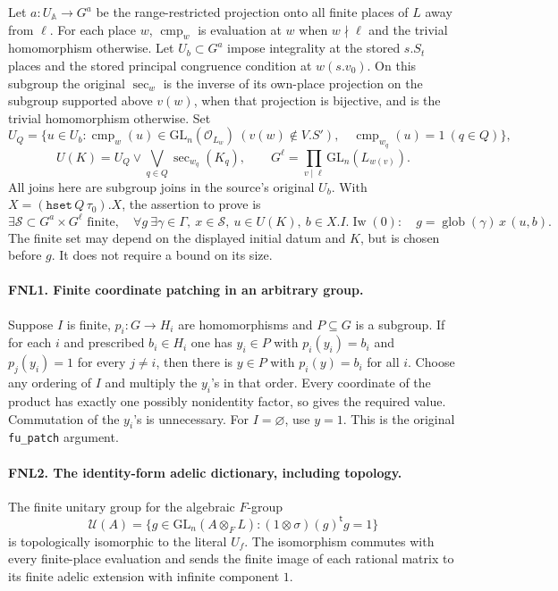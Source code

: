 Let \(a:U_{\mathbb A}\to G^a\) be the range-restricted projection onto
all finite places of \(L\) away from \(\ell\).  For each place \(w\),
\(\operatorname{cmp}_w\) is evaluation at \(w\) when \(w\nmid\ell\)
and the trivial homomorphism otherwise.  Let \(U_b\subset G^a\) impose
integrality at the stored \(s.S_t\) places and the stored principal
congruence condition at \(w(s.v_0)\).  On this subgroup the original
\(\operatorname{sec}_w\) is the inverse of its own-place projection
on the subgroup supported above \(v(w)\), when that projection is
bijective, and is the trivial homomorphism otherwise.  Set
\[
 U_Q=\{u\in U_b:\operatorname{cmp}_w(u)\in\mathrm{GL}_n(\mathcal O_{L_w})
      \ (v(w)\notin V.S'),\quad
      \operatorname{cmp}_{w_q}(u)=1\ (q\in Q)\},
\]
\[
 U(K)=U_Q\vee\bigvee_{q\in Q}\operatorname{sec}_{w_q}(K_q),\qquad
 G^\ell=\prod_{v\mid\ell}\mathrm{GL}_n(L_{w(v)}).
\]
All joins here are subgroup joins in the source's original \(U_b\).
With \(X=(\texttt{hset}\,Q\,\tau_0).X\), the assertion to prove is
\begin{equation}\label{eq:fnl-target}
 \exists\mathcal S\subset G^a\times G^\ell\text{ finite},\quad
 \forall g\ \exists\gamma\in\Gamma,\ x\in\mathcal S,\ u\in U(K),\
 b\in X.I.\operatorname{Iw}(0):\quad
             g=\operatorname{glob}(\gamma)\,x\,(u,b).
\end{equation}
The finite set may depend on the displayed initial datum and \(K\), but
is chosen before \(g\).  It does not require a bound on its size.

\paragraph{FNL1. Finite coordinate patching in an arbitrary group.}
\label{claim:FNL1}
Suppose \(I\) is finite, \(p_i:G\to H_i\) are homomorphisms and
\(P\subseteq G\) is a subgroup.  If for each \(i\) and prescribed
\(b_i\in H_i\) one has \(y_i\in P\) with
\(p_i(y_i)=b_i\) and \(p_j(y_i)=1\) for every \(j\ne i\), then there
is \(y\in P\) with \(p_i(y)=b_i\) for all \(i\).
Choose any ordering of \(I\) and multiply the \(y_i\)'s in that order.
Every coordinate of the product has exactly one possibly nonidentity
factor, so gives the required value.  Commutation of the \(y_i\)'s is
unnecessary.  For \(I=\varnothing\), use \(y=1\).
This is the original \texttt{fu\_patch} argument.

\paragraph{FNL2. The identity-form adelic dictionary, including topology.}
\label{claim:FNL2}
The finite unitary group for the algebraic \(F\)-group
\[
 \mathcal U(A)=\{g\in\mathrm{GL}_n(A\otimes_F L):
                     (1\otimes\sigma)(g)^{\mathsf t}g=1\}
\]
is topologically isomorphic to the literal \(U_f\).  The isomorphism
commutes with every finite-place evaluation and sends the finite image of
each rational matrix to its finite adelic extension with infinite
component \(1\).

